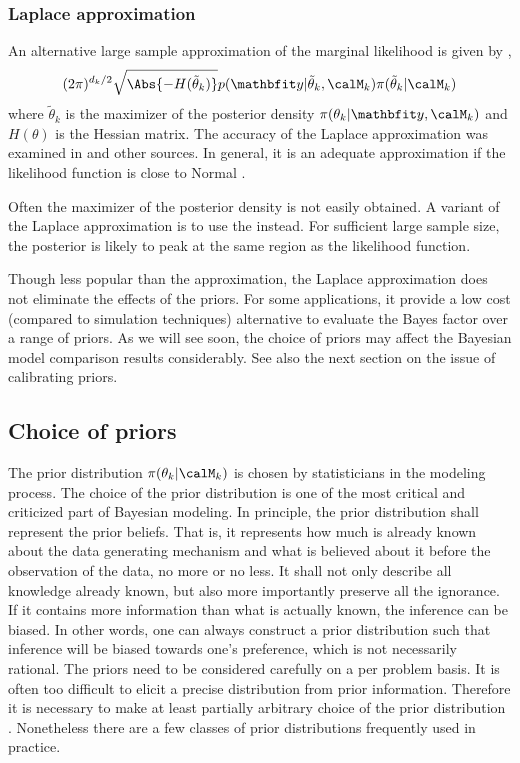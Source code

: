 

\subsubsection{Laplace approximation}
\label{ssub:Laplace approximation}

An alternative large sample approximation of the marginal likelihood is given
by \cite{Tierney:1986vx},
\begin{equation}
  (2\pi)^{d_k/2}\sqrt{\Abs{-H(\tilde\theta_k)}}
  p(\data|\tilde\theta_k,\calM_k)\pi(\tilde\theta_k|\calM_k)
\end{equation}
where $\tilde\theta_k$ is the maximizer of the posterior density
$\pi(\theta_k|\data,\calM_k)$ and $H(\theta)$ is the Hessian matrix. The
accuracy of the Laplace approximation was examined in \cite{Kass:1992tz} and
other sources. In general, it is an adequate approximation if the likelihood
function is close to Normal \cite{Kass:1995vb}.

Often the maximizer of the posterior density is not easily obtained. A
variant of the Laplace approximation is to use the \mle instead. For
sufficient large sample size, the posterior is likely to peak at the same
region as the likelihood function.

Though less popular than the \bic approximation, the Laplace approximation
does not eliminate the effects of the priors. For some applications, it
provide a low cost (compared to simulation techniques) alternative to evaluate
the Bayes factor over a range of priors. As we will see soon, the choice of
priors may affect the Bayesian model comparison results considerably. See also
the next section on the issue of calibrating priors.

\subsection{Choice of priors}
\label{sub:Choice of priors}

The prior distribution $\pi(\theta_k|\calM_k)$ is chosen by statisticians in
the modeling process. The choice of the prior distribution is one of the most
critical and criticized part of Bayesian modeling. In principle, the prior
distribution shall represent the prior beliefs. That is, it represents how
much is already known about the data generating mechanism and what is believed
about it before the observation of the data, no more or no less. It shall not
only describe all knowledge already known, but also more importantly preserve
all the ignorance. If it contains more information than what is actually
known, the inference can be biased. In other words, one can always construct a
prior distribution such that inference will be biased towards one's
preference, which is not necessarily rational. The priors need to be
considered carefully on a per problem basis. It is often too difficult to
elicit a precise distribution from prior information. Therefore it is
necessary to make at least partially arbitrary choice of the prior
distribution \cite[][chap.~3]{Robert:2007tc}\cite{Kass:1995vb}. Nonetheless
there are a few classes of prior distributions frequently used in practice.

